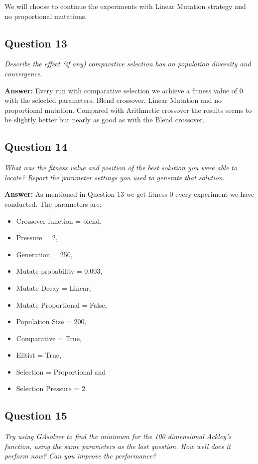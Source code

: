 \documentclass[a4paper]{article}
\begin{document}
We will choose to continue the experiments with Linear Mutation strategy and no proportional mutations. 

\subsection*{Question 13}
\emph{Describe the effect (if any) comparative selection has on population diversity and convergence.} 

\textbf{Answer:} Every run with comparative selection we achieve a fitness value of 0 with the selected parameters. Blend crossover, Linear Mutation and no proportional mutation. Compared with Arithmetic crossover the results seems to be slightly better but nearly as good as with the Blend crossover. 

\subsection*{Question 14}
\emph{What was the fitness value and position of the best solution you were
able to locate? Report the parameter settings you used to generate that
solution.} 

\textbf{Answer:} As mentioned in Question 13 we get fitness 0 every experiment
we have conducted. The parameters are: 
\begin{itemize}
\item Crossover function = blend, 
\item Pressure = 2,
\item Generation = 250,
\item Mutate probability = 0.003,
\item Mutate Decay = Linear, 
\item Mutate Proportional = False, 
\item Population Size = 200, 
\item Comparative = True, 
\item Elitist = True, 
\item Selection = Proportional and 
\item Selection Pressure = 2.
\end{itemize}

\subsection*{Question 15}
\emph{Try using GAsolver to find the minimum for the 100 dimensional Ackley's function, using the same parameters as the last question. How
well does it perform now? Can you improve the performance?} 
\end{document}
